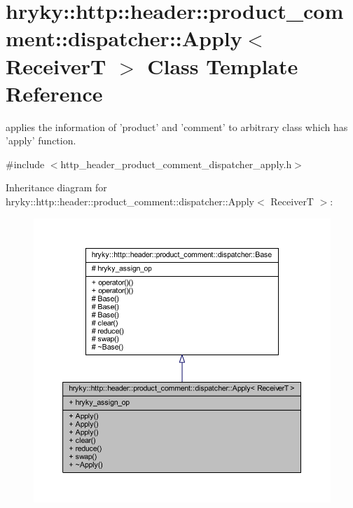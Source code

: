\hypertarget{classhryky_1_1http_1_1header_1_1product__comment_1_1dispatcher_1_1_apply}{\section{hryky\-:\-:http\-:\-:header\-:\-:product\-\_\-comment\-:\-:dispatcher\-:\-:Apply$<$ Receiver\-T $>$ Class Template Reference}
\label{classhryky_1_1http_1_1header_1_1product__comment_1_1dispatcher_1_1_apply}
}


applies the information of 'product' and 'comment' to arbitrary class which has 'apply' function.  




{\ttfamily \#include $<$http\-\_\-header\-\_\-product\-\_\-comment\-\_\-dispatcher\-\_\-apply.\-h$>$}



Inheritance diagram for hryky\-:\-:http\-:\-:header\-:\-:product\-\_\-comment\-:\-:dispatcher\-:\-:Apply$<$ Receiver\-T $>$\-:
\nopagebreak
\begin{figure}[H]
\begin{center}
\leavevmode
\includegraphics[width=350pt]{classhryky_1_1http_1_1header_1_1product__comment_1_1dispatcher_1_1_apply__inherit__graph}
\end{center}
\end{figure}
